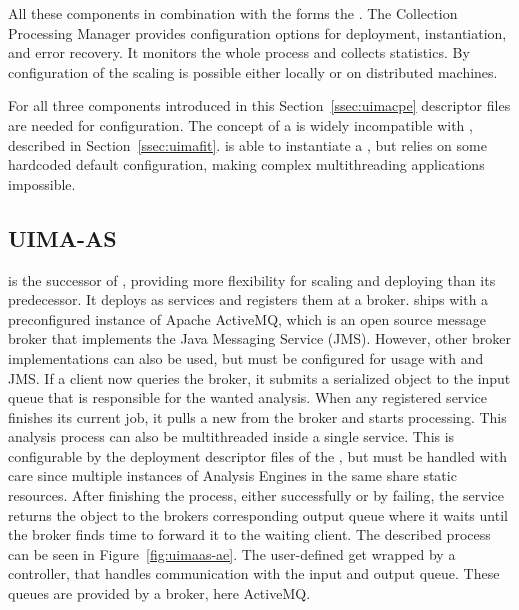 All these components in combination with the \uima{} \cpm{} forms the \uimacpe{}. The Collection Processing Manager provides configuration options for deployment, instantiation, and error recovery. It monitors the whole process and collects statistics. By configuration of the \cpm{} scaling is possible either locally or on distributed machines.

For all three components introduced in this Section~\ref{ssec:uimacpe} \xml{} descriptor files are needed for configuration. The concept of a \uimacpe{} is widely incompatible with \uimafit{}, described in Section~\ref{ssec:uimafit}. \uimafit{} is able to instantiate a \cpe{}, but relies on some hardcoded default configuration, making complex multithreading applications impossible.


\subsection{UIMA-AS}
\label{ssec:uimaas}
\uimaas{} is the successor of \uimacpe{}, providing more flexibility for scaling and deploying than its predecessor. It deploys \anens{} as services and registers them at a broker. \uimaas{} ships with a preconfigured instance of Apache ActiveMQ, which is an open source message broker that implements the Java Messaging Service (JMS). However, other broker implementations can also be used, but must be configured for usage with \uimaas{} and JMS. If a \uimaas{} client now queries the broker, it submits a serialized \cas{} object to the input queue that is responsible for the wanted analysis. When any registered service finishes its current job, it pulls a new \cas{} from the broker and starts processing. This analysis process can also be multithreaded inside a single service. This is configurable by the deployment \xml{} descriptor files of the \anens{}, but must be handled with care since multiple instances of Analysis Engines in the same \jvm{} share static resources. After finishing the process, either successfully or by failing, the service returns the \cas{} object to the brokers corresponding output queue where it waits until the broker finds time to forward it to the waiting client. The described process can be seen in Figure~\ref{fig:uimaas-ae}. The user-defined \anen{} get wrapped by a \uimaas{} controller, that handles communication with the input and output queue. These queues are provided by a broker, here ActiveMQ.

